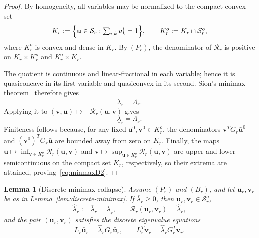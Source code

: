 \documentclass[10pt,a4paper]{amsart}
\newtheorem{lemma}{Lemma}
\begin{document}
\begin{proof}
	By homogeneity, all variables may be normalized to the compact convex set
	\[
	K_r := \Bigl\{\mathbf{u}\in\mathcal{S}_r :
	\textstyle\sum_{i,k}u_k^i=1\Bigr\},
	\qquad K_r^o := K_r\cap\mathcal{S}_r^o,
	\]
	where $K_r^o$ is convex and dense in $K_r$. By $(P_r)$, the denominator of
	$\mathcal{R}_r$ is positive on $K_r\times K_r^o$ and $K_r^o\times K_r$.
	
	The quotient is continuous and linear-fractional in each variable;
	hence it is quasiconcave in its first variable and quasiconvex in its
	second. Sion's minimax theorem~\cite{Sion1958} therefore gives
	\[
	\overline\lambda_r=\overline\Lambda_r.
	\]
	Applying it to
	\((\mathbf v,\mathbf u)\mapsto-\mathcal R_r(\mathbf u,\mathbf v)\)
	gives
	\[
	\underline\lambda_r=\underline\Lambda_r.
	\]
	Finiteness follows because, for any fixed
	$\mathbf{u}^0,\mathbf{v}^0\in K_r^o$, the denominators
	$\bar{\mathbf{v}}^T G_r\bar{\mathbf{u}}^0$ and
	$(\bar{\mathbf{v}}^0)^T G_r\bar{\mathbf{u}}$ are bounded away from zero on
	$K_r$. Finally, the maps
	$\mathbf{u}\mapsto\inf_{\mathbf{v}\in K_r^o}\mathcal{R}_r(\mathbf{u},\mathbf{v})$
	and $\mathbf{v}\mapsto\sup_{\mathbf{u}\in K_r^o}\mathcal{R}_r(\mathbf{u},\mathbf{v})$
	are upper and lower semicontinuous on the compact set $K_r$, respectively, so
	their extrema are attained, proving~\eqref{eq:minmaxD2}.
\end{proof}

\begin{lemma}[Discrete minimax collapse]\label{lem:discrete-collapse}
	Assume $(P_r)$ and $(B_r)$, and let $\mathbf{u}_r,\mathbf{v}_r$ be as in
	Lemma~\ref{lem:discrete-minimax}. If $\overline\lambda_r\ge0$, then
	$\mathbf{u}_r,\mathbf{v}_r\in\mathcal{S}_r^o$,
	\[
	\hat\lambda_r := \overline\lambda_r = \underline\lambda_r,
	\qquad
	\mathcal{R}_r(\mathbf{u}_r,\mathbf{v}_r) = \hat\lambda_r,
	\]
	and the pair $(\mathbf{u}_r,\mathbf{v}_r)$ satisfies the discrete eigenvalue
	equations
	\begin{equation}\label{eq:uravn}
		L_r\bar{\mathbf{u}}_r = \hat\lambda_r G_r\bar{\mathbf{u}}_r,
		\qquad
		L_r^T\bar{\mathbf{v}}_r = \hat\lambda_r G_r^T\bar{\mathbf{v}}_r.
	\end{equation}
\end{lemma}
\end{document}
